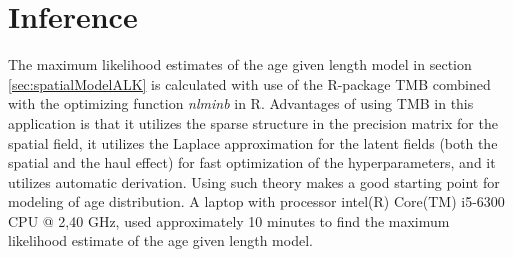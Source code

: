 \documentclass[a4paper 12pt]{article}
\numberwithin{equation}{section}
\begin{document}
%
%
%




















\section{Inference}
\label{sec:inference}
The maximum likelihood estimates of the age given length model in section \ref{sec:spatialModelALK} is calculated with use of the R-package TMB \citep{kristensen2015tmb} combined with the optimizing function \textit{nlminb} in R. Advantages of using TMB in this application is that it utilizes the sparse structure in the precision matrix for the spatial field, it utilizes the Laplace approximation for the latent fields (both the spatial and the haul effect) for fast optimization of the hyperparameters, and it utilizes automatic derivation.  Using such theory makes a good starting point for modeling of age distribution.  A laptop with  processor intel(R) Core(TM) i5-6300 CPU @ 2,40 GHz, used approximately 10 minutes to find the maximum likelihood estimate of the age given length model. 
\end{document}
